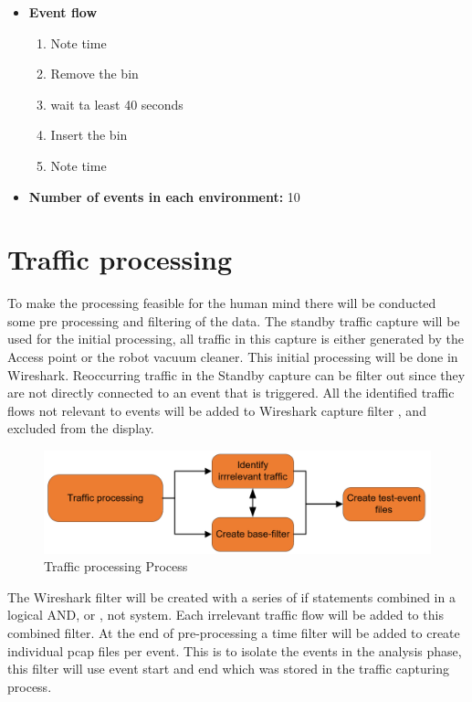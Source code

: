 \begin{itemize}
    \item \textbf{Event flow} \begin{enumerate}
                                    \item Note time
                                    \item Remove the bin
                                    \item wait ta least 40 seconds
                                    \item Insert the bin
                                    \item Note time
                                \end{enumerate}
    \item \textbf{Number of events in each environment:} 10
\end{itemize}

\section{Traffic processing}
To make the processing feasible for the human mind there will be conducted some pre processing and filtering of the data. The standby traffic capture will be used for the initial processing, all traffic in this capture is either generated by the Access point or the robot vacuum cleaner. This initial processing will be done in Wireshark. Reoccurring traffic in the Standby capture can be filter out since they are not directly connected to an event that is triggered. All the identified traffic flows not relevant to events will be added to Wireshark capture filter \cite{wireshark}, and excluded from the display.

\begin{figure}[H]
    \centering
    \includegraphics[width=\textwidth]{figures/TrafficProcessingProcess.png}
    \caption{Traffic processing Process}
    \label{fig:TrafficProcessingProcess}
\end{figure}


The Wireshark filter will be created with a series of if statements combined in a logical AND, or , not system. Each irrelevant traffic flow will be added to this combined filter. At the end of pre-processing a time filter will be added to create individual pcap files per event. This is to isolate the events in the analysis phase, this filter will use event start and end which was stored in the traffic capturing process. 

